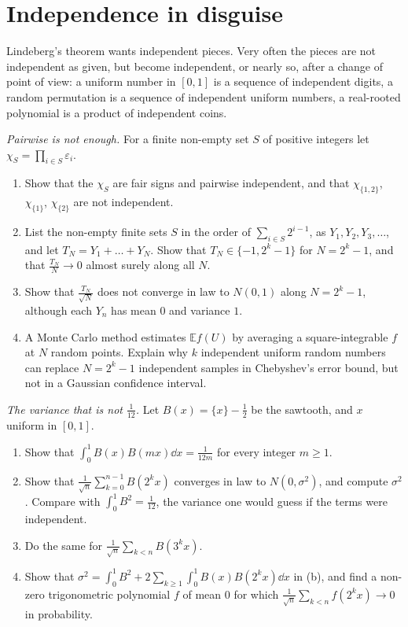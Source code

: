 \section{Independence in disguise}

Lindeberg's theorem wants independent pieces. Very often the pieces are not independent as given, but become independent, or nearly so, after a change of
point of view: a uniform number in $[0,1]$ is a sequence of independent digits, a random permutation is a sequence of independent uniform numbers, a
real-rooted polynomial is a product of independent coins.

\begin{exercise}[$\star$]\label{pb:pairwisebits}
\emph{Pairwise is not enough.} For a finite non-empty set $S$ of positive integers let $\chi_S=\prod_{i\in S}\varepsilon_i$.
\begin{enumerate}[label=(\alph*)]
\item Show that the $\chi_S$ are fair signs and pairwise independent, and that $\chi_{\{1,2\}}$, $\chi_{\{1\}}$, $\chi_{\{2\}}$ are not independent.
\item List the non-empty finite sets $S$ in the order of $\sum_{i\in S}2^{i-1}$, as $Y_1,Y_2,Y_3,\dots$, and let $T_N=Y_1+\dots+Y_N$. Show that $T_N\in\{-1,2^k-1\}$ for
$N=2^k-1$, and that $\frac{T_N}N\to0$ almost surely along all $N$.
\item Show that $\frac{T_N}{\sqrt N}$ does not converge in law to $N(0,1)$ along $N=2^k-1$, although each $Y_n$ has mean $0$ and variance $1$.
\item A Monte Carlo method estimates $\mathbb Ef(U)$ by averaging a square-integrable $f$ at $N$ random points. Explain why $k$ independent uniform random numbers can replace $N=2^k-1$ independent
samples in Chebyshev's error bound, but not in a Gaussian confidence interval.
\end{enumerate}
\end{exercise}

\begin{exercise}[$\star\star$]\label{pb:sawtooth}
\emph{The variance that is not $\frac1{12}$.} Let $B(x)=\{x\}-\frac12$ be the sawtooth, and $x$ uniform in $[0,1]$.
\begin{enumerate}[label=(\alph*)]
\item Show that $\int_0^1B(x)B(mx)\dd x=\frac1{12m}$ for every integer $m\ge1$.
\item Show that $\frac1{\sqrt n}\sum_{k=0}^{n-1}B(2^kx)$ converges in law to $N(0,\sigma^2)$, and compute $\sigma^2$. Compare with $\int_0^1B^2=\frac1{12}$, the variance one
would guess if the terms were independent.
\item Do the same for $\frac1{\sqrt n}\sum_{k<n}B(3^kx)$.
\item Show that $\sigma^2=\int_0^1B^2+2\sum_{k\ge1}\int_0^1B(x)B(2^kx)\dd x$ in (b), and find a non-zero trigonometric polynomial $f$ of mean $0$ for which
$\frac1{\sqrt n}\sum_{k<n}f(2^kx)\to0$ in probability.
\end{enumerate}
\end{exercise}

